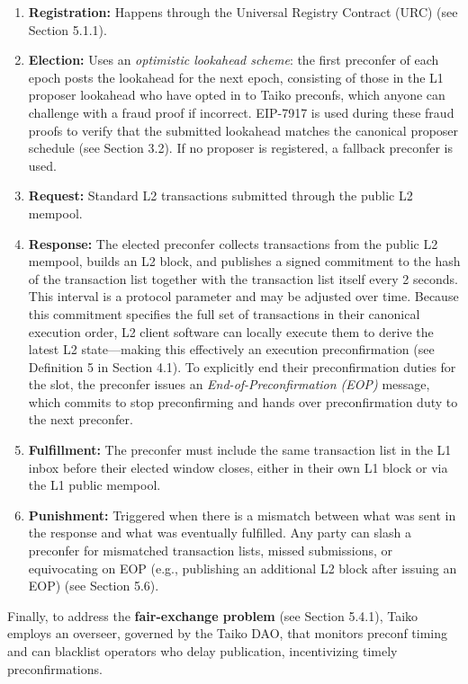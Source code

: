 \documentclass[a4paper]{article}
\theoremstyle{boldstyle}
\begin{document}
        \begin{enumerate}
        \item \textbf{Registration:} Happens through the Universal Registry Contract (URC) (see Section 5.1.1).
        \item \textbf{Election:} Uses an \emph{optimistic lookahead scheme}: the first preconfer of each epoch posts the lookahead for the next epoch, consisting of those in the L1 proposer lookahead who have opted in to Taiko preconfs, which anyone can challenge with a fraud proof if incorrect. EIP-7917 is used during these fraud proofs to verify that the submitted lookahead matches the canonical proposer schedule (see Section 3.2). If no proposer is registered, a fallback preconfer is used.
        \item \textbf{Request:} Standard L2 transactions submitted through the public L2 mempool.
        \item \textbf{Response:} The elected preconfer collects transactions from the public L2 mempool, builds an L2 block, and publishes a signed commitment to the hash of the transaction list together with the transaction list itself every 2 seconds. This interval is a protocol parameter and may be adjusted over time. Because this commitment specifies the full set of transactions in their canonical execution order, L2 client software can locally execute them to derive the latest L2 state—making this effectively an execution preconfirmation (see Definition 5 in Section 4.1). To explicitly end their preconfirmation duties for the slot, the preconfer issues an \emph{End-of-Preconfirmation (EOP)} message, which commits to stop preconfirming and hands over preconfirmation duty to the next preconfer.
        \item \textbf{Fulfillment:} The preconfer must include the same transaction list in the L1 inbox before their elected window closes, either in their own L1 block or via the L1 public mempool.
        \item \textbf{Punishment:} Triggered when there is a mismatch between what was sent in the response and what was eventually fulfilled. Any party can slash a preconfer for mismatched transaction lists, missed submissions, or equivocating on EOP (e.g., publishing an additional L2 block after issuing an EOP) (see Section 5.6).
        \end{enumerate}
        
        Finally, to address the \textbf{fair-exchange problem} (see Section 5.4.1), Taiko employs an overseer, governed by the Taiko DAO, that monitors preconf timing and can blacklist operators who delay publication, incentivizing timely preconfirmations.    
        
\end{document}

